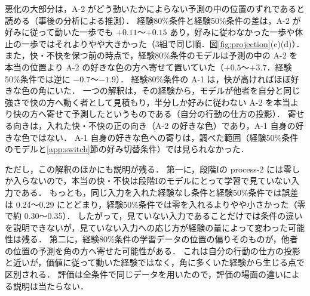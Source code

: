 悪化の大部分は，A-2 がどう動いたかによらない予測の中の位置のずれであると読める（事後の分析による推測）．
経験80\%条件と経験50\%条件の差は，A-2 が好みに従って動いた一歩でも $+0.11$〜$+0.15$ あり，好みに従わなかった一歩や休止の一歩ではそれよりやや大きかった（3組で同じ順．図\ref{fig:projection}(c)(d)）．
また，快・不快を保つ前の時点で，経験80\%条件のモデルは予測の中の A-2 を本当の位置より A-2 の好きな色の方へ寄せて置いていた（$+0.5$〜$+3.7$．経験50\%条件では逆に $-0.7$〜$-1.9$）．
経験80\%条件の A-1 は，快が高ければほぼ好きな色の角にいた．
一つの解釈は，その経験から，モデルが他者を自分と同じ強さで快の方へ動く者として見積もり，半分しか好みに従わない A-2 を本当より快の方へ寄せて予測したというものである（自分の行動の仕方の投影）．
寄せる向きは，入れた快・不快の正の向き（A-2 の好きな色）であり，A-1 自身の好きな色ではない．
A-1 自身の好きな色への寄りは，調べた範囲（経験50\%条件のモデルと\ref{app:switch}節の好み切替条件）では見られなかった．

ただし，この解釈のほかにも説明が残る．
第一に，段階Iの process-2 には零しか入らないので，本当の快・不快は段階Iのモデルにとって学習で見ていない入力である．
もっとも，同じ入力を入れた経験なし条件と経験50\%条件では誤差は 0.24〜0.29 にとどまり，経験50\%条件では零を入れるよりやや小さかった（零で約 0.30〜0.35）．
したがって，見ていない入力であることだけでは条件の違いを説明できないが，見ていない入力への応じ方が経験の量によって変わった可能性は残る．
第二に，経験80\%条件の学習データの位置の偏りそのものが，他者の位置の予測を角の方へ寄せた可能性がある．
これは自分の行動の仕方の投影と近いが，価値に従って動いた経験ではなく，角に多くいた経験から生じる点で区別される．
評価は全条件で同じデータを用いたので，評価の場面の違いによる説明は当たらない．

